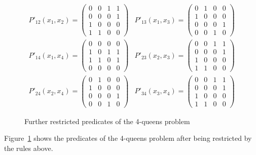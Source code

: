 \documentclass[a4paper,11pt]{article}
\begin{document}
\begin{figure}
\begin{eqnarray*}
P'_{12}(x_1, x_2) = \left(
\begin{array}{cccc}
0 & 0 & 1 & 1 \\
0 & 0 & 0 & 1 \\
1 & 0 & 0 & 0 \\
1 & 1 & 0 & 0
\end{array} \right) &
P'_{13}(x_1, x_3) = \left(
\begin{array}{cccc}
0 & 1 & 0 & 0 \\
1 & 0 & 0 & 0 \\
0 & 0 & 0 & 1 \\
0 & 0 & 1 & 0
\end{array} \right) \\
P'_{14}(x_1, x_4) = \left(
\begin{array}{cccc}
0 & 0 & 0 & 0 \\
1 & 0 & 1 & 1 \\
1 & 1 & 0 & 1 \\
0 & 0 & 0 & 0
\end{array} \right) &
P'_{23}(x_2, x_3) = \left(
\begin{array}{cccc}
0 & 0 & 1 & 1 \\
0 & 0 & 0 & 1 \\
1 & 0 & 0 & 0 \\
1 & 1 & 0 & 0
\end{array} \right) \\
P'_{24}(x_2, x_4) = \left(
\begin{array}{cccc}
0 & 1 & 0 & 0 \\
1 & 0 & 0 & 0 \\
0 & 0 & 0 & 1 \\
0 & 0 & 1 & 0
\end{array} \right) &
P'_{34}(x_3, x_4) = \left(
\begin{array}{cccc}
0 & 0 & 1 & 1 \\
0 & 0 & 0 & 1 \\
1 & 0 & 0 & 0 \\
1 & 1 & 0 & 0
\end{array} \right)
\end{eqnarray*}
\caption{Further restricted predicates of the 4-queens problem}
\label{fig:res-predicates}
\end{figure}
Figure~\ref{fig:res-predicates} shows the predicates of the 4-queens problem
after being restricted by the rules above.
\end{document}
